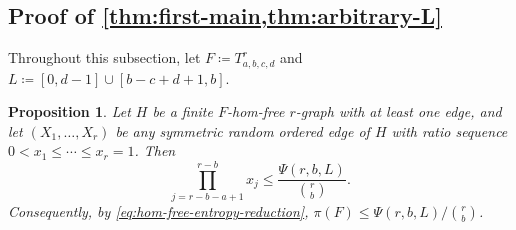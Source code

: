 \documentclass[10pt,a4paper]{article}
\theoremstyle{plain}
\newtheorem{proposition}[proposition]{Proposition}
\theoremstyle{definition}
\theoremstyle{plain}
\begin{document}
\subsection{Proof of \texorpdfstring{\cref{thm:first-main,thm:arbitrary-L}}{Theorems 1.1 and 1.2}}

Throughout this subsection, let $F\coloneqq T^r_{a,b,c,d}$ and $L\coloneqq[0,d-1]\cup[b-c+d+1,b]$.

\begin{proposition}\label{prop:first-block}
Let $H$ be a finite $F$-hom-free $r$-graph with at least one edge, and let $(X_1,\ldots,X_r)$ be any symmetric random ordered edge of $H$ with ratio sequence $0<x_1\le\cdots\le x_r=1$.  Then
\[
        \prod_{j=r-b-a+1}^{r-b}x_j
        \le \frac{\Psi(r,b,L)}{\binom{r}{b}}.
\]
Consequently, by \cref{eq:hom-free-entropy-reduction}, $\pi(F)\le {\Psi(r,b,L)}/{\binom{r}{b}}$. 
\end{proposition}
\end{document}
